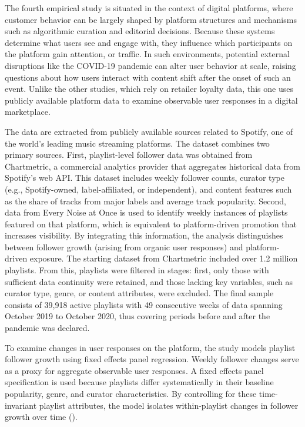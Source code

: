 The fourth empirical study is situated in the context of digital platforms, where customer behavior can be largely shaped by platform structures and mechanisms such as algorithmic curation and editorial decisions. Because these systems determine what users see and engage with, they influence which participants on the platform gain attention, or traffic. In such environments, potential external disruptions like the COVID-19 pandemic can alter user behavior at scale, raising questions about how users interact with content shift after the onset of such an event. Unlike the other studies, which rely on retailer loyalty data, this one uses publicly available platform data to examine observable user responses in a digital marketplace.

The data are extracted from publicly available sources related to Spotify, one of the world’s leading music streaming platforms. The dataset combines two primary sources. First, playlist-level follower data was obtained from Chartmetric, a commercial analytics provider that aggregates historical data from Spotify’s web API. This dataset includes weekly follower counts, curator type (e.g., Spotify-owned, label-affiliated, or independent), and content features such as the share of tracks from major labels and average track popularity. Second, data from Every Noise at Once is used to identify weekly instances of playlists featured on that platform, which is equivalent to platform-driven promotion that increases visibility. By integrating this information, the analysis distinguishes between follower growth (arising from organic user responses) and platform-driven exposure. The starting dataset from Chartmetric included over 1.2 million playlists. From this, playlists were filtered in stages: first, only those with sufficient data continuity were retained, and those lacking key variables, such as curator type, genre, or content attributes, were excluded. The final sample consists of 39,918 active playlists with 49 consecutive weeks of data spanning October 2019 to October 2020, thus covering periods before and after the pandemic was declared.

To examine changes in user responses on the platform, the study models playlist follower growth using fixed effects panel regression. Weekly follower changes serve as a proxy for aggregate observable user responses. A fixed effects panel specification is used because playlists differ systematically in their baseline popularity, genre, and curator characteristics. By controlling for these time-invariant playlist attributes, the model isolates within-playlist changes in follower growth over time (\cite{Papies2022-ln}).

